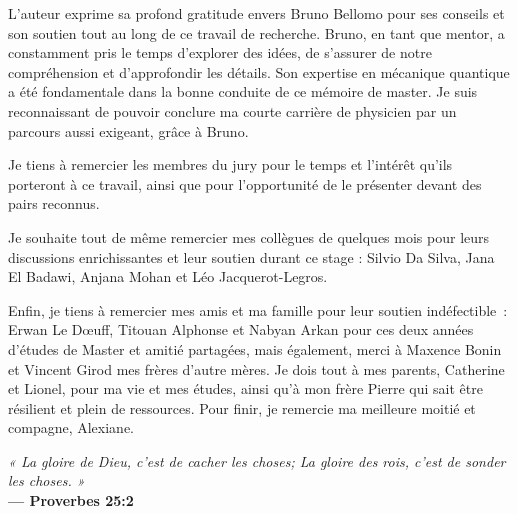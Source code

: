 \begin{justify}
    \hspace{0.5cm}L'auteur exprime sa profond gratitude envers Bruno Bellomo pour ses conseils et son soutien tout au long de ce travail de recherche. Bruno, en tant que mentor, a constamment pris le temps d'explorer des idées, de s'assurer de notre compréhension et d'approfondir les détails. Son expertise en mécanique quantique a été fondamentale dans la bonne conduite de ce mémoire de master. Je suis reconnaissant de pouvoir conclure ma courte carrière de physicien par un parcours aussi exigeant, grâce à Bruno.\par\vspace{0.15cm}\noindent
    Je tiens à remercier les membres du jury pour le temps et l'intérêt qu'ils porteront à ce travail, ainsi que pour l'opportunité de le présenter devant des pairs reconnus.\par\vspace{0.15cm}\noindent
    Je souhaite tout de même remercier mes collègues de quelques mois pour leurs discussions enrichissantes et leur soutien durant ce stage : Silvio Da Silva, Jana El Badawi, Anjana Mohan et Léo Jacquerot-Legros.\par\vspace{0.15cm}\noindent
    Enfin, je tiens à remercier mes amis et ma famille pour leur soutien indéfectible~: Erwan Le D{\oe}uff, Titouan Alphonse et Nabyan Arkan pour ces deux années d'études de Master et amitié partagées, mais également, merci à Maxence Bonin et Vincent Girod mes frères d'autre mères. Je dois tout à mes parents, Catherine et Lionel, pour ma vie et mes études, ainsi qu'à mon frère Pierre qui sait être résilient et plein de ressources. Pour finir, je remercie ma meilleure moitié et compagne, Alexiane.
\end{justify}
\vfill
\begin{flushright}
    \small{\textit{« La gloire de Dieu, c'est de cacher les choses; La gloire des rois, c'est de sonder les choses. »} \\
    \textbf{— Proverbes 25:2}}
\end{flushright}\newpage

\normalsize %
\tableofcontents
{}